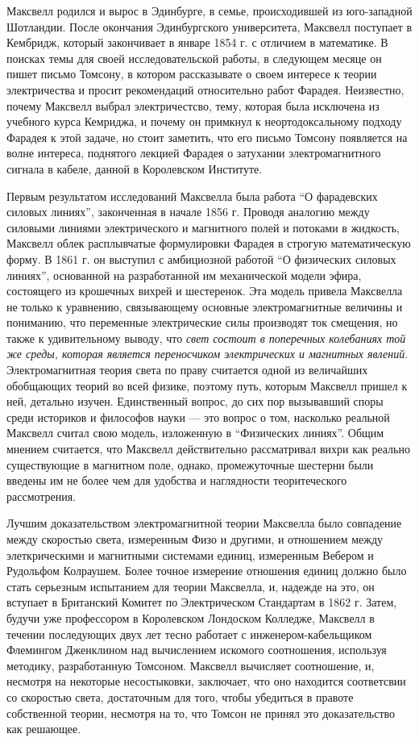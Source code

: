 \documentclass[12pt, oneside, a4paper]{article}
\begin{document}
Максвелл родился и вырос в Эдинбурге, в семье, происходившей из юго-западной Шотландии. После окончания Эдинбургского университета, Максвелл поступает в Кембридж, который закончивает в январе 1854 г. с отличием в математике. В поисках темы для своей исследовательской работы, в следующем месяце он пишет письмо Томсону, в котором рассказывате о своем интересе к теории электричества и просит рекомендаций относительно работ Фарадея. Неизвестно, почему Максвелл выбрал электричестсво, тему, которая была исключена из учебного курса Кемриджа, и почему он примкнул к неортодоксальному подходу Фарадея к этой задаче, но стоит заметить, что  его письмо Томсону появляется на волне интереса, поднятого лекцией Фарадея о затухании электромагнитного сигнала в кабеле, данной в Королевском Институте. 

Первым результатом исследований Максвелла была работа ``О фарадевских силовых линиях'', законченная в начале 1856 г. Проводя аналогию между силовыми линиями электрического и магнитного полей и потоками в жидкость, Максвелл облек расплывчатые формулировки Фарадея в строгую математическую форму. В 1861 г. он выступил с амбициозной работой ``О физических силовых линиях'', основанной на разработанной им механической модели эфира, состоящего из крошечных вихрей и шестеренок. Эта модель привела Максвелла не только к уравнению, связывающему основные электромагнитные величины и пониманию, что переменные электрические силы производят ток смещения, но также к удивительному выводу, что \emph{свет состоит в поперечных колебаниях той же среды, которая является переносчиком электрических и магнитных явлений}. 
Электромагнитная теория света по праву считается одной из величайших обобщающих теорий во всей физике, поэтому путь, которым Максвелл пришел к ней, детально изучен. Единственный вопрос, до сих пор вызывавший споры среди историков и философов науки --- это вопрос о том, насколько реальной Максвелл считал свою модель, изложенную в ``Физических линиях''. Общим мнением считается, что Максвелл действительно рассматривал вихри как реально существующие в магнитном поле, однако, промежуточные шестерни были введены им не более чем для удобства и наглядности теоритеческого рассмотрения. 

Лучшим доказательством электромагнитной теории Максвелла было совпадение между скоростью света, измеренным Физо и другими, и отношением между элеткрическими и магнитными системами единиц, измеренным Вебером  и Рудольфом Колраушем. Более точное измерение отношения единиц должно было стать серьезным испытанием для теории Максвелла, и, надежде на это, он вступает в Британский Комитет по Электрическом Стандартам в 1862 г. Затем, будучи уже профессором в Королевском Лондоском Колледже, Максвелл в течении последующих двух лет тесно работает с инженером-кабельщиком Флемингом Дженклином над вычислением искомого соотношения, используя методику, разработанную Томсоном. Максвелл вычисляет соотношение, и, несмотря на некоторые несостыковки, заключает, что оно находится соответсвии со скоростью света, достаточным для того, чтобы убедиться в правоте собственной теории, несмотря на то, что Томсон не принял это доказательство как решающее. 
\end{document}
